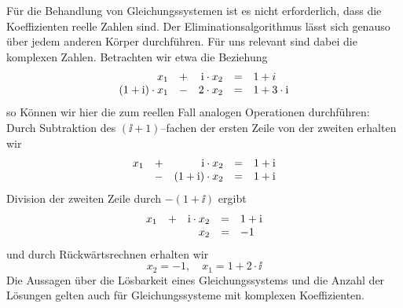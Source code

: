 
\bigbreak

\begin{notiz}\label{lin_alg_gls_komplex} 
Für die Behandlung von Gleichungssystemen ist es nicht erforderlich, dass die Koeffizienten 
reelle Zahlen sind. Der Eliminationsalgorithmus lässt sich genauso über jedem anderen Körper durchführen. 
Für uns relevant sind dabei die komplexen Zahlen. Betrachten wir etwa die Beziehung
  	$$ \begin{array} {r c r c l}
  	x_1 & + & \ii \cdot x_2 & = & 1 + i \\
  	(1+\ii) \cdot  x_1 & - & 2 \cdot x_2 & = & 1 + 3 \cdot  \ii
  	\end{array} $$
so Können wir hier die zum reellen Fall analogen Operationen durchführen: Durch Subtraktion des $(\ii+1)$--fachen 
der ersten Zeile von der zweiten erhalten wir
  	$$ \begin{array} {r c r c l}
  	x_1 & + & \ii \cdot x_2 & = & 1 + \ii \\
  	& - & (1+\ii) \cdot  x_2 & = & 1 + \ii
  	\end{array} $$
Division der zweiten Zeile durch $-(1+\ii)$ ergibt
  	$$ \begin{array} {r c r c l}
  	x_1 & + & \ii \cdot x_2 & = & 1 + \ii \\
  	&  & x_2 & = & -1
  	\end{array} $$
und durch Rückwärtsrechnen erhalten wir 
  	$$ x_2 = -1, \quad x_1 = 1 + 2 \cdot \ii $$
Die Aussagen über die Lösbarkeit eines Gleichungssystems und die Anzahl der Lösungen gelten auch für 
Gleichungssysteme mit komplexen Koeffizienten.
\end{notiz}

\bigbreak

